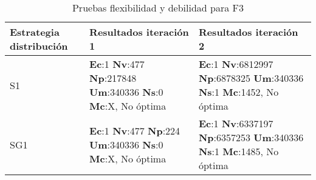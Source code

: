 \begin{center}
\begin{longtable}{|p{4cm}|p{6.5cm}|p{6.5cm}|}
	\caption{Pruebas flexibilidad y debilidad para F3}\\
	\hline
	\cellcolor[gray]{0.9} \textbf{Estrategia distribución} & \cellcolor[gray]{0.9}\textbf{Resultados iteración 1} &\cellcolor[gray]{0.9} \textbf{Resultados iteración 2} \\
	\hline
	S1& \textbf{Ec}:1 \textbf{Nv}:477  \textbf{Np}:217848  \textbf{Um}:340336  \textbf{Ns}:0 \textbf{Mc}:X, No óptima & \textbf{Ec}:1 \textbf{Nv}:6812997  \textbf{Np}:6878325  \textbf{Um}:340336  \textbf{Ns}:1 \textbf{Mc}:1452, No óptima\\
	\hline
	SG1& \textbf{Ec}:1 \textbf{Nv}:477  \textbf{Np}:224  \textbf{Um}:340336  \textbf{Ns}:0 \textbf{Mc}:X, No óptima & \textbf{Ec}:1 \textbf{Nv}:6337197  \textbf{Np}:6357253  \textbf{Um}:340336  \textbf{Ns}:1 \textbf{Mc}:1485, No óptima\\
	\hline
\end{longtable}	
\end{center}


